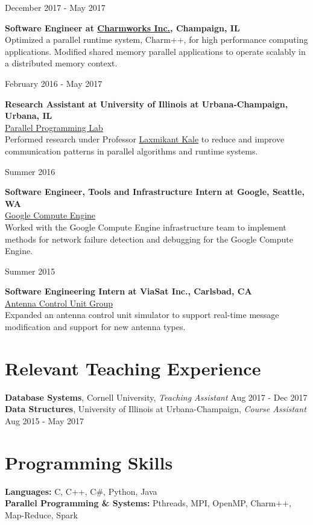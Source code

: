 \documentclass[10pt]{article}
\newcommand{\leftrightrow}[2]{
	#1 \hfill #2 \\
}
\newcommand{\teachblock}[2]{
	\leftrightrow{#1}{#2}
}
\newcommand{\workblock}[4]{
\begin{minipage}[t]{0.14\textwidth}
\vspace*{0.4em}
\begin{flushright}#3\end{flushright}
\end{minipage}
\hfill\vline\hfill
\begin{minipage}[t]{0.82\textwidth}
\vspace*{0.4em}
	\textbf{#1} \\
	#2 \\
    #4
\end{minipage}
\vspace{0.7em}
}
\newcommand{\workblocktwo}[3]{
\begin{minipage}[t]{0.14\textwidth}
\vspace*{0.4em}
\begin{flushright}#2\end{flushright}
\end{minipage}
\hfill\vline\hfill
\begin{minipage}[t]{0.82\textwidth}
\vspace*{0.4em}
	\textbf{#1} \\
    #3
\end{minipage}
\vspace{0.7em}
}
\begin{document}
\workblocktwo{Software Engineer at \href{http://www.charmplusplus.com/}{Charmworks Inc.}, Champaign, IL}{December 2017 - May 2017}{Optimized a parallel
runtime system, Charm++\footnotemark[1], for high performance computing applications. Modified shared memory parallel applications to operate scalably in a distributed memory context.} 

\workblock{Research Assistant at University of Illinois at Urbana-Champaign, Urbana, IL}{\href{http://charm.cs.uiuc.edu/}{Parallel Programming Lab}}{February 2016 - May 2017}{Performed research under Professor \href{http://charm.cs.uiuc.edu/~kale/}{Laxmikant Kale} to reduce and improve communication patterns in parallel algorithms and runtime systems.}

\workblock{Software Engineer, Tools and Infrastructure Intern at Google, Seattle, WA}{\href{https://cloud.google.com/compute/}{Google Compute Engine}}{Summer 2016}{Worked with the Google Compute Engine infrastructure team to implement methods for network failure detection and debugging for the Google Compute Engine.}

\workblock{Software Engineering Intern at ViaSat Inc., Carlsbad, CA}{\href{https://www.viasat.com/products/antenna-controllers}{Antenna Control Unit Group}}{Summer 2015}{Expanded an antenna control unit simulator to support real-time message modification and support for new antenna types.}

\vspace{-0.8em}

\section{Relevant Teaching Experience}
\vspace{0.1em}
\teachblock{\textbf{Database Systems}, Cornell University, \textit{Teaching Assistant}}{Aug 2017 - Dec 2017}
\teachblock{\textbf{Data Structures}, University of Illinois at Urbana-Champaign, \textit{Course Assistant}}{Aug 2015 - May 2017}

\vspace{-0.8em}

\section{Programming Skills}
\vspace{0.1em}
\textbf{Languages:} C, C++, C\#, Python, Java \\
\textbf{Parallel Programming \& Systems:} Pthreads, MPI, OpenMP, Charm++, Map-Reduce, Spark
\end{document}
